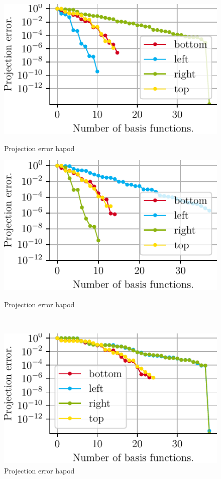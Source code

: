 \documentclass[a4paper]{eccomas_paper-2024}
\begin{document}

\begin{figure}[!htb]
  \includegraphics{./figures/beam/fig_proj_error_left_hapod.pdf}
  \caption{Projection error hapod}\label{fig:proj_error_left_hapod}
\endminipage\hfill
{}
  \includegraphics{./figures/beam/fig_proj_error_right_hapod.pdf}
  \caption{Projection error hapod}\label{fig:proj_error_right_hapod}
\endminipage\hfill\\
\begin{center}
%
  \includegraphics{./figures/beam/fig_proj_error_inner_hapod.pdf}
  \caption{Projection error hapod}\label{fig:proj_error_inner_hapod}
\endminipage
\end{center}
\end{figure}
\end{document}
